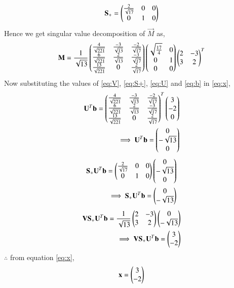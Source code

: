 \documentclass[journal,12pt,twocolumn]{IEEEtran}
\begin{document}
\begin{align}
\mathbf{S}_+ = \begin{pmatrix}\frac{2}{\sqrt{17}}&0&0\\0&1&0\end{pmatrix}\label{eq:S+}
\end{align}
Hence we get singular value decomposition of $\vec{M}$ as,
\begin{align}
\mathbf{M} = \frac{1}{\sqrt{13}}\begin{pmatrix}\frac{4}{\sqrt{221}} &\frac{-3}{\sqrt{13}} & \frac{-2}{\sqrt{17}}\\\frac{6}{\sqrt{221}} &\frac{2}{\sqrt{13}} &\frac{-3}{\sqrt{17}} \\\frac{13}{\sqrt{221}}&0& \frac{2}{\sqrt{17}}\end{pmatrix}\begin{pmatrix}\sqrt{\frac{17}{4}}&0\\0&1\\0&0\end{pmatrix}\begin{pmatrix}2&-3\\3&2\end{pmatrix}^T
\end{align}
Now substituting the values of \eqref{eq:V}, \eqref{eq:S+}, \eqref{eq:U} and \eqref{eq:b} in \eqref{eq:x},
\begin{align}
\mathbf{U}^T\mathbf{b} = \begin{pmatrix}\frac{4}{\sqrt{221}} &\frac{-3}{\sqrt{13}} & \frac{-2}{\sqrt{17}}\\\frac{6}{\sqrt{221}} &\frac{2}{\sqrt{13}} &\frac{-3}{\sqrt{17}} \\\frac{13}{\sqrt{221}}&0& \frac{2}{\sqrt{17}}\end{pmatrix}^T\begin{pmatrix}3\\-2\\0\end{pmatrix}\\
\implies \mathbf{U}^T\mathbf{b} = \begin{pmatrix}0\\-\sqrt{13}\\0\end{pmatrix}\label{eq:Utb}
\end{align}
\begin{align}
\mathbf{S}_+\mathbf{U}^T\mathbf{b} = \begin{pmatrix}\frac{2}{\sqrt{17}}&0&0\\0&1&0\end{pmatrix}\begin{pmatrix}0\\-\sqrt{13}\\0\end{pmatrix}\\
\implies \mathbf{S}_+\mathbf{U}^T\mathbf{b} = \begin{pmatrix}0\\-\sqrt{13}\end{pmatrix}\label{eq:SUtb}
\end{align}
\begin{align}
\mathbf{V}\mathbf{S}_+\mathbf{U}^T\mathbf{b} = \frac{1}{\sqrt{13}}\begin{pmatrix}2&-3\\3&2\end{pmatrix}\begin{pmatrix}0\\-\sqrt{13}\end{pmatrix}\\
\implies \mathbf{V}\mathbf{S}_+\mathbf{U}^T\mathbf{b} = \begin{pmatrix}3\\-2\end{pmatrix}
\end{align}
$\therefore$ from equation \eqref{eq:x},
\begin{align}
\mathbf{x} = \begin{pmatrix}3 \\ -2 \end{pmatrix} \label{eq:x_svd}
\end{align}
\end{document}
